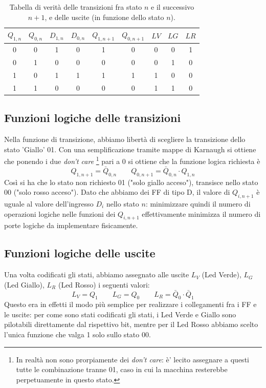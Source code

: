 \documentclass[10pt,a4paper]{article}
\begin{document}
\begin{table}[!htb]
\centering
\begin{tabular}{|c|c|c|c||c|c||c|c|c|}
\hline
$Q_{1,n}$ & $Q_{0,n}$ & $D_{1, n}$ & $D_{0, n}$& $Q_{1,n+1}$ & $Q_{0,n+1}$ & $LV$ & $LG$ & $LR$\\
\hline
0 & 0 & 1 & 0 & 1 & 0 & 0 & 0 & 1 \\
0 & 1 & 0 & 0 & 0 & 0 & 0 & 1 & 0\\
1 & 0 & 1 & 1 & 1 & 1 & 1 & 0 & 0\\
1 & 1 & 0 & 0 & 0 & 0 & 1 & 1 & 0\\
\hline
\end{tabular}
\caption{Tabella di verità delle transizioni fra stato $n$ e il successivo $n+1$, e delle uscite (in funzione dello stato $n$).\label{tab:transizioneenabled}}
\end{table}
\subsection{Funzioni logiche delle transizioni}
Nella funzione di transizione, abbiamo libertà di scegliere la transizione dello stato 'Giallo' 01.
Con una semplificazione tramite mappe di Karnaugh si ottiene che ponendo i due \emph{don't care} 
\footnote{In realtà non sono prorpiamente dei \emph{don't care}: è' lecito assegnare a questi  tutte le combinazione tranne 01, caso in cui la macchina resterebbe perpetuamente in questo stato.} pari a 0 si ottiene che la funzione logica richiesta è \begin{equation}
Q_{1, n+1} = \bar {Q}_{0,n} \qquad Q_{0,n+1} = \bar {Q}_{0,n} \cdot Q_{1,n} 
\end{equation}
Così si ha che lo stato non richiesto 01 ("solo giallo acceso"), transisce nello stato 00 ("solo rosso acceso").
Dato che abbiamo dei FF di tipo D, il valore di $Q_{i, n+1}$ è uguale al valore dell'ingresso $D_i$ nello stato $n$: minimizzare quindi il numero di operazioni logiche nelle funzioni dei $Q_{i,n+1}$ effettivamente minimizza il numero di porte logiche da implementare fisicamente.

\subsection{Funzioni logiche delle uscite}
Una volta codificati gli stati, abbiamo assegnato alle uscite $L_V$ (Led Verde), $L_G$ (Led Giallo), $L_R$ (Led Rosso) i seguenti valori:
\begin{equation}
L_V = Q_1 \qquad L_G = Q_0 \qquad L_R = \bar{Q}_0\cdot \bar{Q}_1
\end{equation}
Questo era in effetti il modo più semplice per realizzare i collegamenti fra i FF e le uscite: per come sono stati codificati gli stati, i Led Verde e Giallo sono pilotabili direttamente dal rispettivo bit, mentre per il Led Rosso abbiamo scelto l'unica funzione che valga 1 solo sullo stato 00. 
\end{document}
